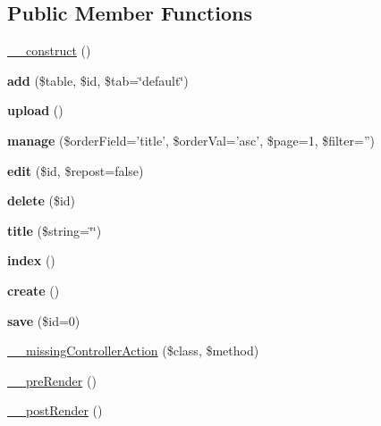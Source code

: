 \subsection*{Public Member Functions}
\begin{DoxyCompactItemize}
\item 
\hyperlink{class_assets_controller_a095c5d389db211932136b53f25f39685}{\_\-\_\-construct} ()
\item 
\hypertarget{class_assets_controller_abcb78c365578d6db46668573ab6902ce}{
{\bfseries add} (\$table, \$id, \$tab=\char`\"{}default\char`\"{})}
\label{class_assets_controller_abcb78c365578d6db46668573ab6902ce}

\item 
\hypertarget{class_assets_controller_a160ae63d11b56d3190b172facb43a343}{
{\bfseries upload} ()}
\label{class_assets_controller_a160ae63d11b56d3190b172facb43a343}

\item 
\hypertarget{class_assets_controller_a4ce3f57de57e08cc04782af2a0c537cd}{
{\bfseries manage} (\$orderField='title', \$orderVal='asc', \$page=1, \$filter='')}
\label{class_assets_controller_a4ce3f57de57e08cc04782af2a0c537cd}

\item 
\hypertarget{class_assets_controller_a3e2ca5065723bc35286c37f76b86fac2}{
{\bfseries edit} (\$id, \$repost=false)}
\label{class_assets_controller_a3e2ca5065723bc35286c37f76b86fac2}

\item 
\hypertarget{class_assets_controller_a2f8258add505482d7f00ea26493a5723}{
{\bfseries delete} (\$id)}
\label{class_assets_controller_a2f8258add505482d7f00ea26493a5723}

\item 
\hypertarget{class_table_controller_a09086607bdf0caa184393e8fa08a55bc}{
{\bfseries title} (\$string=\char`\"{}\char`\"{})}
\label{class_table_controller_a09086607bdf0caa184393e8fa08a55bc}

\item 
\hypertarget{class_table_controller_a149eb92716c1084a935e04a8d95f7347}{
{\bfseries index} ()}
\label{class_table_controller_a149eb92716c1084a935e04a8d95f7347}

\item 
\hypertarget{class_table_controller_a435e7d7525d4bcd0ed5e34a469f3adf6}{
{\bfseries create} ()}
\label{class_table_controller_a435e7d7525d4bcd0ed5e34a469f3adf6}

\item 
\hypertarget{class_table_controller_a1a4fb85b713fd3fae33e237428c918f3}{
{\bfseries save} (\$id=0)}
\label{class_table_controller_a1a4fb85b713fd3fae33e237428c918f3}

\item 
\hyperlink{class_controller_a728c573e418d1f979340a4669524cacd}{\_\-\_\-missingControllerAction} (\$class, \$method)
\item 
\hyperlink{class_controller_ad86994d2463ea27cab892176e6509bdb}{\_\-\_\-preRender} ()
\item 
\hyperlink{class_controller_adc3c9cc4788f7ba7d1368fdc43568b1d}{\_\-\_\-postRender} ()
\end{DoxyCompactItemize}
